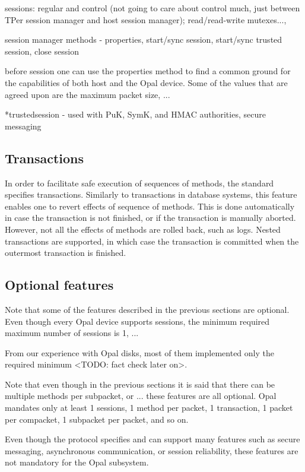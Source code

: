 sessions: regular and control (not going to care about control much, just between TPer session manager and host session manager); read/read-write mutexes..., 

session manager methods - properties, start/sync session, start/sync trusted session, close session

before session one can use the properties method to find a common ground for the capabilities of both host and the Opal device. Some of the values that are agreed upon are the maximum packet size, ...

*trustedsession - used with PuK, SymK, and HMAC authorities, secure messaging

\subsection{Transactions}

In order to facilitate safe execution of sequences of methods, the standard specifies transactions. Similarly to transactions in database systems, this feature enables one to revert effects of sequence of methods. This is done automatically in case the transaction is not finished, or if the transaction is manually aborted. However, not all the effects of methods are rolled back, such as logs. Nested transactions are supported, in which case the transaction is committed when the outermost transaction is finished.


\subsection{Optional features}

Note that some of the features described in the previous sections are optional. Even though every Opal device supports sessions, the minimum required maximum number of sessions is 1, ...

From our experience with Opal disks, most of them implemented only the required minimum <TODO: fact check later on>.

Note that even though in the previous sections it is said that there can be multiple methods per subpacket, or ... these features are all optional. Opal mandates only at least 1 sessions, 1 method per packet, 1 transaction, 1 packet per compacket, 1 subpacket per packet, and so on.





Even though the protocol specifies and can support many features such as secure messaging, asynchronous communication, or session reliability, these features are not mandatory for the Opal subsystem.

